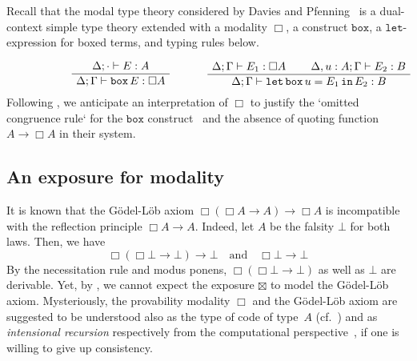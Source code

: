 \documentclass[a4paper,UKenglish,numberwithinsect,cleveref,thm-restate]{lipics-v2021}
\numberwithin{equation}{section}
\theoremstyle{plain}
\begin{document}
\begin{remark}\label{remark:S4-modality}
  Recall that the modal type theory considered by Davies and Pfenning~\cite{Davies2001b} is a dual-context simple type theory extended with a \SFour modality $\Box$, a construct $\mathtt{box}$, a $\mathtt{let}$-expression for boxed terms, and typing rules below.
\[
\begin{minipage}{.47\linewidth}
  \begin{prooftree}
    \AxiomC{$\Delta; \cdot \vdash E : A$}
    \UnaryInfC{$\Delta; \Gamma \vdash \mathtt{box}\,E:\Box A$}
  \end{prooftree}
\end{minipage}%
\begin{minipage}{0.47\linewidth}
  \begin{prooftree}
    \AxiomC{$\Delta; \Gamma \vdash E_1 : \Box A$}
    \AxiomC{$\Delta, u : A; \Gamma \vdash E_2 : B$}
  \BinaryInfC{$\Delta; \Gamma \vdash \mathtt{let}\,\mathtt{box}\, u = E_1\, \mathtt{in}\,E_2 : B$}
  \end{prooftree}
\end{minipage}
\]
Following , we anticipate an interpretation of $\Box$ to justify the `omitted congruence rule` for the $\mathtt{box}$ construct~\cite[Section~2.5]{Davies2001b} and the absence of quoting function $A \to \Box A$ in their system.
\end{remark}

\subsection{An exposure for \texorpdfstring{\GL}{GL} modality}
It is known that the Gödel-Löb axiom $\Box(\Box A \to A) \to \Box A$ is incompatible with the reflection principle $\Box A \to A$.
Indeed, let $A$ be the falsity $\bot$ for both laws. Then, we have
\[
  \Box(\Box \bot \to \bot) \to \bot
  \quad\text{and}\quad
  \Box \bot \to \bot
\]
By the necessitation rule and modus ponens, $\Box (\Box \bot \to \bot)$ as well as $\bot$ are derivable.
Yet, by , we cannot expect the exposure $\boxtimes$ to model the Gödel-Löb axiom.
Mysteriously, the provability modality $\Box$ and the Gödel-Löb axiom are suggested to be understood also as the type of code of type~$A$ (cf.~) and as \emph{intensional recursion} respectively from the computational perspective~\cite{Kavvos2017b}, if one is willing to give up consistency.
\end{document}
